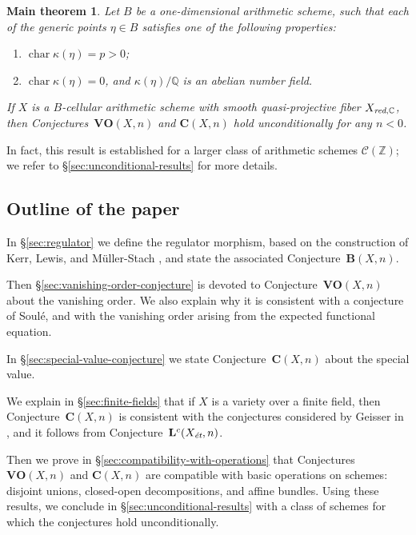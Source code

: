 \documentclass[10pt,a4paper,oneside,draft]{article}
\DeclareMathOperator{\fchar}{char}
\newcommand{\CC}{\mathbb{C}}
\newcommand{\QQ}{\mathbb{Q}}
\newcommand{\ZZ}{\mathbb{Z}}
\newcommand{\et}{\text{\it \'{e}t}}
\newcommand{\red}{\text{\it red}}
\theoremstyle{myplain}
\newtheorem*{maintheorem*}{Main theorem}
\theoremstyle{mydefinition}
\numberwithin{equation}{section}
\begin{document}
\begin{maintheorem*}
  Let $B$ be a one-dimensional arithmetic scheme, such that each of the generic
  points $\eta \in B$ satisfies one of the following properties:
  \begin{enumerate}
  \item[a)] $\fchar \kappa (\eta) = p > 0$;

  \item[b)] $\fchar \kappa (\eta) = 0$, and $\kappa (\eta)/\QQ$ is an abelian
    number field.
  \end{enumerate}
  If $X$ is a $B$-cellular arithmetic scheme with smooth quasi-projective fiber
  $X_{\red,\CC}$, then Conjectures~$\mathbf{VO} (X,n)$ and
  $\mathbf{C} (X,n)$ hold unconditionally for any $n < 0$.
\end{maintheorem*}

In fact, this result is established for a larger class of arithmetic schemes
$\mathcal{C} (\ZZ)$; we refer to \S\ref{sec:unconditional-results} for more
details.

\subsection*{Outline of the paper}

In \S\ref{sec:regulator} we define the regulator morphism, based on the
construction of Kerr, Lewis, and M\"{u}ller-Stach
\cite{Kerr-Lewis-Muller-Stach-2006}, and state the associated
Conjecture~$\mathbf{B} (X,n)$.

Then \S\ref{sec:vanishing-order-conjecture} is devoted to
Conjecture~$\mathbf{VO} (X,n)$ about the vanishing order. We also explain why it
is consistent with a conjecture of Soul\'{e}, and with the vanishing order
arising from the expected functional equation.

In \S\ref{sec:special-value-conjecture} we state Conjecture~$\mathbf{C} (X,n)$
about the special value.

We explain in \S\ref{sec:finite-fields} that if $X$ is a variety over a finite
field, then Conjecture~$\mathbf{C} (X,n)$ is consistent with the conjectures
considered by Geisser in
\cite{Geisser-2004,Geisser-2006,Geisser-2010-arithmetic-homology}, and it
follows from Conjecture~$\mathbf{L}^c (X_\et,n)$.

Then we prove in \S\ref{sec:compatibility-with-operations} that Conjectures
$\mathbf{VO} (X,n)$ and $\mathbf{C} (X,n)$ are compatible with basic operations
on schemes: disjoint unions, closed-open decompositions, and affine
bundles. Using these results, we conclude in \S\ref{sec:unconditional-results}
with a class of schemes for which the conjectures hold unconditionally.
\end{document}
